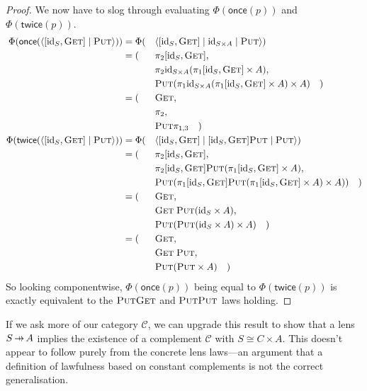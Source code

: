\documentclass[11pt,a4paper]{article}
\theoremstyle{plain}
\theoremstyle{definition}
\newcommand{\C}{\mathscr{C}}
\newcommand{\id}{\mathrm{id}}
\newcommand{\rep}[2]{{\ensuremath \left\langle #1 \mid #2 \right\rangle}}
\newcommand{\repthree}[3]{{\ensuremath \langle #1 \mid #2 \mid #3 \rangle}}
\newcommand{\fget}{\textsc{Get}}
\newcommand{\fput}{\textsc{Put}}
\newcommand{\once}{\mathsf{once}}
\newcommand{\twice}{\mathsf{twice}}
\newcommand{\hto}{\ensuremath{\,\mathaccent\shortmid\rightarrow\,}}
\begin{document}
\begin{proof}
  We now have to slog through evaluating $\Phi(\once(p))$ and $\Phi(\twice(p))$.
  \begin{alignat*}{3}
    \Phi(\once(\rep{[\id_S, \fget]}{\fput})) &=
    \Phi(&&\repthree{[\id_S, \fget]}{\id_{S \times A}}{\fput}) \\
    &= (&&\pi_2 [\id_S, \fget], \\
    &&&\pi_2 \id_{S \times A} (\pi_1 [\id_S, \fget] \times A), \\
    &&& \fput (\pi_1 \id_{S \times A} (\pi_1 [\id_S, \fget] \times A) \times A) \quad) \\
    &= (&&\fget, \\
    &&& \pi_2, \\
    &&& \fput \pi_{1,3} \quad) \\
    \Phi(\twice(\rep{[\id_S, \fget]}{\fput})) &=
    \Phi(&&\repthree{[\id_S, \fget]}{[\id_S, \fget]\fput}{\fput}) \\
    &= (&&\pi_2 [\id_S, \fget], \\
    &&&\pi_2 [\id_S, \fget]\fput (\pi_1 [\id_S, \fget] \times A), \\
    &&& \fput (\pi_1 [\id_S, \fget]\fput (\pi_1 [\id_S, \fget] \times A) \times A)) \quad) \\
    &= (&&\fget, \\
    &&& \fget \; \fput (\id_S \times A), \\
    &&& \fput (\fput (\id_S \times A) \times A) \quad) \\
    &= (&&\fget, \\
    &&& \fget \; \fput, \\
    &&& \fput (\fput \times A) \quad)
  \end{alignat*}
  So looking componentwise, $\Phi(\once(p))$ being equal to $\Phi(\twice(p))$ is exactly equivalent to the $\fput\fget$ and $\fput\fput$ laws holding.
\end{proof}

If we ask more of our category $\C$, we can upgrade this result to show that a lens $S \hto A$ implies the existence of a complement $\C$ with $S \cong C \times A$. This doesn't appear to follow purely from the concrete lens laws---an argument that a definition of lawfulness based on constant complements is not the correct generalisation.
\end{document}

